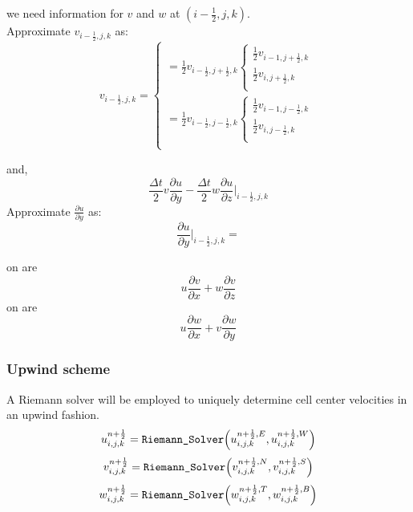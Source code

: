 \documentclass{article}
\numberwithin{equation}{subsection}
\begin{document}
we need information for $v$ and $w$ at $(i-\frac{1}{2},j,k)$.\\
Approximate $v_{i-\frac{1}{2},j,k}$ as:
\begin{equation}
v_{i-\frac{1}{2},j,k} =
	\begin{cases}
	= \frac{1}{2}v_{i-\frac{1}{2},j+\frac{1}{2},k}
		\begin{cases}
		\frac{1}{2}v_{i-1,j+\frac{1}{2},k} \\
		\frac{1}{2}v_{i,j+\frac{1}{2},k} \\
		\end{cases}\\
	= \frac{1}{2}v_{i-\frac{1}{2},j-\frac{1}{2},k}
		\begin{cases}
		\frac{1}{2}v_{i-1,j-\frac{1}{2},k} \\
		\frac{1}{2}v_{i,j-\frac{1}{2},k}\\
		\end{cases}\\
	\end{cases}
\end{equation}

and,
\begin{equation}
    \frac{\Delta t}{2}v\frac{\partial u}{\partial y} - \frac{\Delta t}{2}w\frac{\partial u}{\partial z}|_{i-\frac{1}{2},j,k}
\end{equation}
Approximate $\frac{\partial u}{\partial y}$ as:
\begin{equation}
    \frac{\partial u}{\partial y}|_{i-\frac{1}{2},j,k}= 
\end{equation}

on  are
\begin{equation}
    u\frac{\partial v}{\partial x} + w\frac{\partial v}{\partial z}
\end{equation}
on are
\begin{equation}
    u\frac{\partial w}{\partial x} + v\frac{\partial w}{\partial y}
\end{equation}



\subsubsection{Upwind scheme}
A Riemann solver will be employed to uniquely determine cell center velocities in an upwind fashion.
\begin{equation}
u_{i,j,k}^{n+\frac{1}{2}} = \verb|Riemann_Solver| \Big( u_{i,j,k}^{n+\frac{1}{2},E}, u_{i,j,k}^{n+\frac{1}{2},W} \Big)
\end{equation}
\begin{equation}
v_{i,j,k}^{n+\frac{1}{2}} = \verb|Riemann_Solver| \Big( v_{i,j,k}^{n+\frac{1}{2},N}, v_{i,j,k}^{n+\frac{1}{2},S} \Big)
\end{equation}
\begin{equation}
w_{i,j,k}^{n+\frac{1}{2}} = \verb|Riemann_Solver| \Big( w_{i,j,k}^{n+\frac{1}{2},T}, w_{i,j,k}^{n+\frac{1}{2},B} \Big)
\end{equation}
\end{document}
